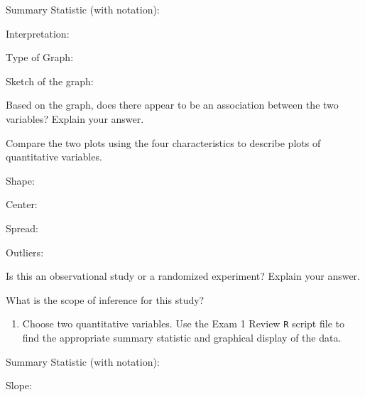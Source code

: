 \documentclass[
]{report}
\providecommand{\tightlist}{%
  \setlength{\itemsep}{0pt}\setlength{\parskip}{0pt}}
\newcommand{\rgi}{\hspace{24pt}}  %
\begin{document}
\rgi Summary Statistic (with notation):

\rgi \rgi Interpretation:

\vspace{0.3in}

\rgi Type of Graph:

\vspace{0.3in}

\rgi Sketch of the graph:

\vspace{1.5in}

\rgi \rgi Based on the graph, does there appear to be an association between the two variables? Explain your answer.

\vspace{0.5in}

\rgi \rgi Compare the two plots using the four characteristics to describe plots of quantitative variables.

\rgi \rgi Shape:

\vspace{0.2in}

\rgi \rgi Center:

\vspace{0.2in}

\rgi \rgi Spread:

\vspace{0.2in}

\rgi \rgi Outliers:

\vspace{0.2in}

\rgi Is this an observational study or a randomized experiment? Explain your answer.

\vspace{0.5in}

\rgi What is the scope of inference for this study?

\vspace{0.3in}

\begin{enumerate}
\def\labelenumi{\arabic{enumi}.}
\setcounter{enumi}{7}
\tightlist
\item
  Choose two quantitative variables. Use the Exam 1 Review \texttt{R} script file to find the appropriate summary statistic and graphical display of the data.
\end{enumerate}

\rgi Summary Statistic (with notation):

\rgi Slope:

\vspace{0.2in}
\end{document}
